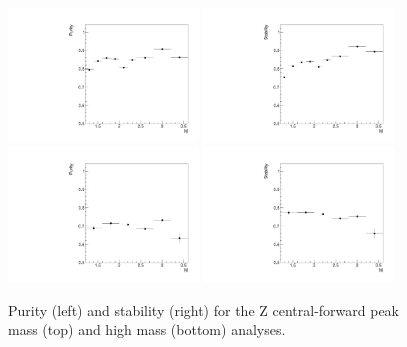 \begin{figure}
  \centering
  \includegraphics[width=0.45\textwidth]{figures/ZCF_purity_peak}%
  \includegraphics[width=0.45\textwidth]{figures/ZCF_stability_peak} \\
  \includegraphics[width=0.45\textwidth]{figures/ZCF_purity_high}%
  \includegraphics[width=0.45\textwidth]{figures/ZCF_stability_high} \\
  \caption{Purity (left) and stability (right) for the Z central-forward peak mass (top) and high mass (bottom) analyses.}
  \label{fig:ZeeCS_purity_stability}
\end{figure}

